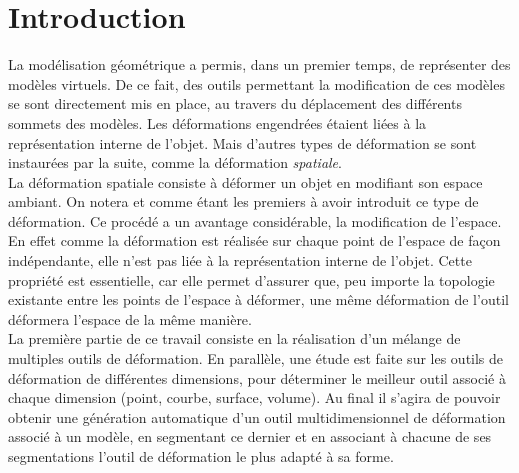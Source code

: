 \chapter{Introduction}

\graphicspath{ {Introduction/IntroductionFigs/PNG/}
  {Introduction/IntroductionFigs/PDF/}
  {Introduction/IntroductionFigs/} }

La modélisation géométrique a permis, dans un premier temps, de
représenter des modèles virtuels. De ce fait, des outils permettant la
modification de ces modèles se sont directement mis en place, au
travers du déplacement des différents sommets des modèles. Les
déformations engendrées étaient liées à la représentation interne de
l'objet. Mais d'autres types de déformation se sont instaurées par la
suite, comme la déformation \textit{spatiale}.
\\

La déformation spatiale consiste à déformer un objet en modifiant son
espace ambiant.  On notera \cite{Bar84} et \cite{SP86} comme étant les
premiers à avoir introduit ce type de déformation. Ce procédé a un
avantage considérable, la modification de l'espace. En effet comme la
déformation est réalisée sur chaque point de l'espace de façon
indépendante, elle n'est pas liée à la représentation interne de
l'objet. Cette propriété est essentielle, car elle permet d'assurer
que, peu importe la topologie existante entre les points de l'espace à
déformer, une même déformation de l'outil déformera l'espace de la
même manière.
\\

La première partie de ce travail consiste en la réalisation d'un
mélange de multiples outils de déformation. En parallèle, une étude
est faite sur les outils de déformation de différentes dimensions,
pour déterminer le meilleur outil associé à chaque dimension (point,
courbe, surface, volume). Au final il s'agira de pouvoir obtenir une
génération automatique d'un outil multidimensionnel de déformation
associé à un modèle, en segmentant ce dernier et en associant à
chacune de ses segmentations l'outil de déformation le plus adapté à
sa forme.
\\

